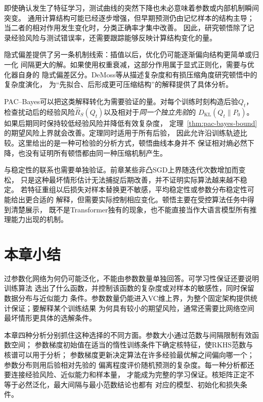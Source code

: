 即使确认发生了特征学习，测试曲线的突然下降也未必意味着参数或内部机制瞬间突变。
通用计算结构可能已经逐步增强，但早期预测仍由记忆样本的结构主导；
当二者的相对作用发生变化时，分类正确率才集中改善。
因此，研究顿悟除了记录经验风险与测试错误率，还需要跟踪能够反映计算结构变化的量。

隐式偏差提供了另一条机制线索：插值以后，优化仍可能逐渐偏向结构更简单或归一化
间隔更大的解。如果使用权重衰减，这部分作用属于显式正则化，需要与优化器自身的
隐式偏差区分。DeMoss等从描述复杂度和有损压缩角度研究顿悟中的复杂度演化，
为“先拟合、后形成更可压缩结构”的解释提供了具体分析。

PAC--Bayes可以把这类解释转化为需要验证的量。对每个训练时刻构造后验$Q_t$，
检查扰动后的经验风险$\hat R_S(Q_t)$以及相对于\emph{同一个独立先验}的
$D_{\mathrm{KL}}(Q_t\|P_0)$。如果后期同时保持较低经验风险并降低有效复杂度，
定理~\ref{thm:pac-bayes-bound}的期望风险上界就会改善。定理同时适用于所有后验，
因此允许沿训练轨迹比较。这里给出的是一种可检验的分析方式，顿悟曲线本身并不
保证相对熵必然下降，也没有证明所有顿悟都由同一种压缩机制产生。

与稳定性的联系也需要单独验证。前章某些非凸SGD上界随迭代次数增加而变松，
只是这种最坏情形估计无法捕捉后期改善，并不证明实际算法越来越不稳定。
若特征重组以后损失对样本替换更不敏感，平均稳定性或参数分布稳定性可能给出更合适的
解释，但需要实际控制相应变化。顿悟主要在受控算法任务中得到清楚展示，
既不是Transformer独有的现象，也不能直接当作大语言模型所有推理能力出现的机制。

\section{本章小结}
\label{sec:deep-learning-summary}

过参数化网络为何仍可能泛化，不能由参数数量单独回答。可学习性保证还要说明训练算法
选出了什么函数，并控制该函数的复杂度或对样本的敏感性，同时保留数据分布与近似能力
条件。参数数量仍能进入VC维上界，为整个固定架构提供统计保证；要解释某个训练结果
为何具有较小的期望风险，通常还需要比网络空间最坏情形更具体的选解条件。

本章四种分析分别抓住这种选择的不同方面。参数大小通过范数与间隔限制有效函数空间；
参数梯度初始值在适当的惰性训练条件下确定核特征，使RKHS范数与核谱可以用于分析；
参数梯度更新决定算法在许多经验最优解之间偏向哪一个；参数分布则用后验相对先验的
偏离程度评价随机预测的复杂度。每一种分析都还要连接经验风险、近似能力和样本量，
才能成为完整的学习保证。核矩阵正定不等于必然泛化，最大间隔与最小范数结论也都有
对应的模型、初始化和损失条件。

